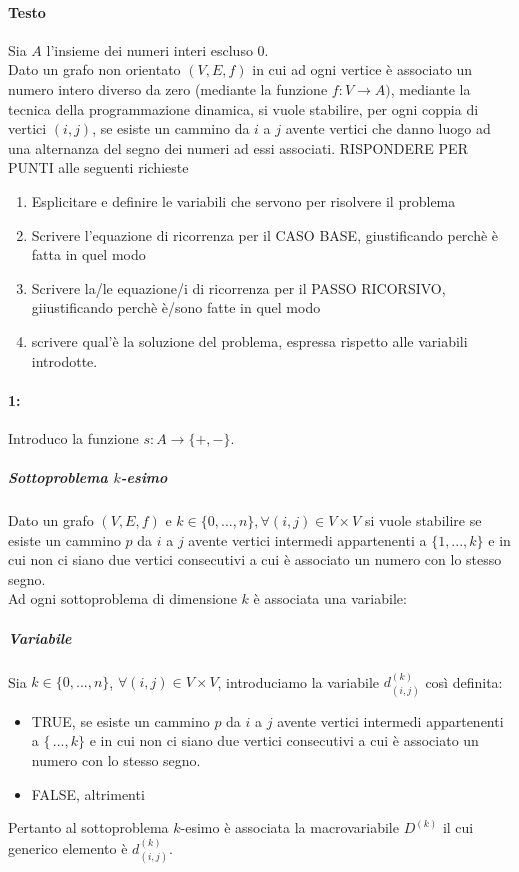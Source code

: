 \documentclass[12pt, a4paper, openany]{book}
\begin{document}
\paragraph*{Testo}Sia $A$ l'insieme dei numeri interi escluso 0.
\\Dato un grafo non orientato $(V,E,f)$ in cui ad ogni vertice è associato un numero intero diverso da zero
(mediante la funzione $f: V\to A)$, mediante la tecnica della programmazione dinamica, si vuole stabilire, per ogni coppia di vertici $(i,j)$,
se esiste un cammino da $i$ a $j$ avente vertici che danno luogo ad una alternanza del segno dei numeri ad essi associati.
RISPONDERE PER PUNTI alle seguenti richieste
\begin{enumerate}
	\item Esplicitare e definire le variabili che servono per risolvere il problema
	\item Scrivere l'equazione di ricorrenza per il CASO BASE, giustificando perchè è fatta in quel modo
	\item Scrivere la/le equazione/i di ricorrenza per il PASSO RICORSIVO, giiustificando perchè è/sono fatte in quel modo
	\item scrivere qual'è la soluzione del problema, espressa rispetto alle variabili introdotte.
\end{enumerate}

\paragraph*{1:}
Introduco la funzione $s: A\to \{+,-\}$.
\subparagraph*{Sottoproblema $k$-esimo}
Dato un grafo $(V,E,f)$ e $k\in \{0,...,n\}, \forall(i,j) \in V\times V$ si vuole stabilire se esiste un cammino $p$
da $i$ a $j$ avente vertici intermedi appartenenti a $\{1,...,k\}$ e in cui non ci siano due vertici consecutivi a cui è associato un numero con lo stesso segno.
\\Ad ogni sottoproblema di dimensione $k$ è associata una variabile:
\subparagraph*{Variabile}
Sia $k\in\{0,...,n\}$, $\forall (i,j) \in V\times V$, introduciamo la variabile $d^{(k)}_{(i,j)}$ così definita:
\begin{itemize}
	\item TRUE, se esiste un cammino $p$ da $i$ a $j$ avente vertici intermedi appartenenti a $\{\,...,k\}$ e in cui non ci siano due vertici consecutivi a cui è associato un numero con lo stesso segno.
	\item FALSE, altrimenti
\end{itemize}
Pertanto al sottoproblema $k$-esimo è associata la macrovariabile $D^{(k)}$ il cui generico elemento è $d^{(k)}_{(i,j)}$.
\end{document}
